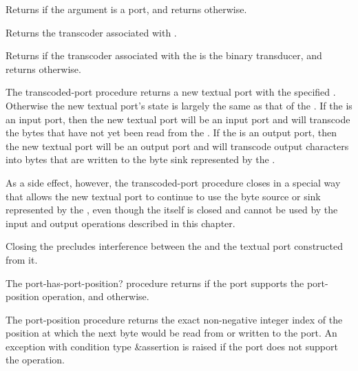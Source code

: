 \begin{entry}{%
}
   
Returns \schtrue{} if the argument is a port, and returns \schfalse{}
otherwise.
\end{entry}

\begin{entry}{%
}

Returns the transcoder associated with .
\end{entry}

\begin{entry}{%
}

Returns \schtrue{} if the transcoder associated with the 
is the binary transducer, and returns \schfalse{} otherwise.
\end{entry}

\begin{entry}{%
}

The {\cf transcoded-port} procedure
returns a new textual port with the specified .
Otherwise the new textual port's state is largely the same as
that of the .
If the  is an input port, then the new textual
port will be an input port and
will transcode the bytes that have not yet been read from
the .
If the  is an output port, then the new textual
port will be an output port and
will transcode output characters into bytes that are
written to the byte sink represented by the .

As a side effect, however, the {\cf transcoded-port} procedure
closes  in
a special way that allows the new textual port to continue to
use the byte source or sink represented by the ,
even though the  itself is closed and cannot
be used by the input and output operations described in this
chapter.

\begin{rationale}
Closing the  precludes interference between
the  and the textual port constructed from it.
\end{rationale}
\end{entry}

\begin{entry}{%
}

The {\cf port-has-port-position?} procedure returns \schtrue{} if the
port supports the {\cf port-position} operation, and \schfalse{}
otherwise.

The {\cf port-position} procedure
returns the exact non-negative integer index of the position at which the
next byte would be read from or written to the port.
An exception with condition type {\cf\&assertion}
is raised if the port does not support the operation.
\end{entry}   

